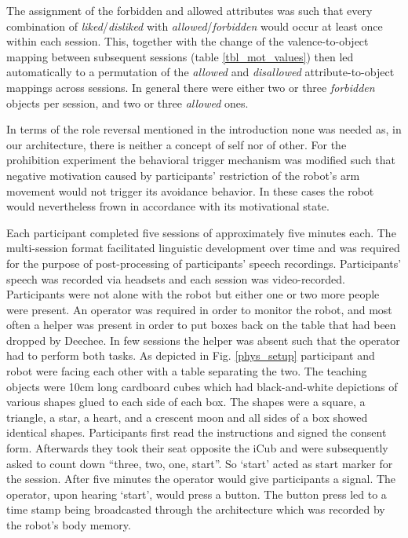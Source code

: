The assignment of the forbidden and allowed attributes was such that every combination of \textit{liked}/\textit{disliked} with \textit{allowed}/\textit{forbidden} 
would occur at least once within each session. This, together with the change of the valence-to-object mapping between subsequent sessions (table \ref{tbl_mot_values}) 
then led automatically to a permutation of the \textit{allowed} and \textit{disallowed} attribute-to-object mappings across sessions. In general there were either 
two or three \textit{forbidden} objects per session, and two or three \textit{allowed} ones.

In terms of the role reversal mentioned in the introduction none was needed as, in our architecture, there is neither a concept of self nor of other. For the prohibition 
experiment the behavioral trigger mechanism was modified such that negative motivation caused by participants' restriction of the robot's arm movement would not trigger 
its avoidance behavior. In these cases the robot would nevertheless frown in accordance with its motivational state.


Each participant completed five sessions of approximately five minutes each. The multi-session format facilitated linguistic development over time and was required
for the purpose of post-processing of participants' speech recordings. Participants' speech was recorded via headsets and each session was video-recorded.
Participants were not alone with the robot but either one or two more people were present. An operator was required in order to monitor the robot, and most often a
helper was present in order to put boxes back on the table that had been dropped by Deechee. In few sessions the helper was absent such that the operator
had to perform both tasks. As depicted in Fig. \ref{phys_setup} participant and robot were facing each other with a table separating the two. The teaching objects 
were 10cm long cardboard cubes which had black-and-white depictions of various shapes glued to each side of each box. The shapes were a square, a triangle, a star,
a heart, and a crescent moon and  all sides of a box showed identical shapes.
Participants first read the instructions and signed the consent form. Afterwards they took their seat opposite the iCub and were subsequently asked to count
down ``three, two, one, start''. So `start' acted as start marker for the session. After five minutes the operator would give participants a signal. 
The operator, upon hearing `start', would press a button. The button press led to a time stamp being broadcasted through the architecture which was recorded by
the robot's body memory.

